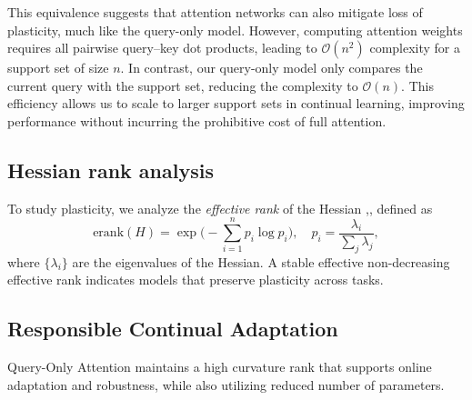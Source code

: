 \documentclass{article}
\begin{document}
This equivalence suggests that attention networks can also mitigate loss of plasticity, much like the query-only model.  
However, computing attention weights requires all pairwise query–key dot products, leading to $\mathcal{O}(n^2)$ complexity for a support set of size $n$.  
In contrast, our query-only model only compares the current query with the support set, reducing the complexity to $\mathcal{O}(n)$.  
This efficiency allows us to scale to larger support sets in continual learning, improving performance without incurring the prohibitive cost of full attention.


\subsection{Hessian rank analysis}

To study plasticity, we analyze the \textit{effective rank} of the Hessian \citep{lewandowski2023curvature},\citep{roy2007effective},  
defined as
\begin{equation}
\mathrm{erank}(H) = \exp\!\Big(-\sum_{i=1}^n p_i \log p_i\Big), 
\quad 
p_i = \frac{\lambda_i}{\sum_j \lambda_j},
\label{eq:effective_rank}
\end{equation}
where $\{\lambda_i\}$ are the eigenvalues of the Hessian.  
A stable effective non-decreasing effective rank indicates models that preserve plasticity across tasks.


\subsection{Responsible Continual Adaptation}
Query-Only Attention maintains a high curvature rank that supports online adaptation and robustness, while also utilizing reduced number of parameters.


\end{document}
